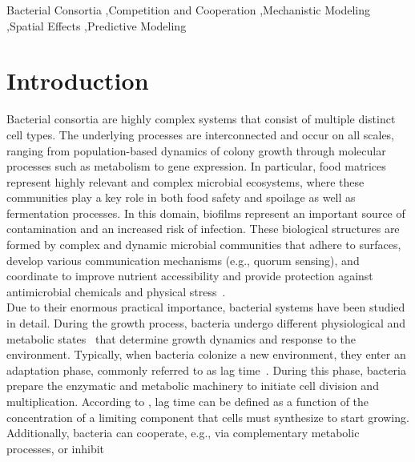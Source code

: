 \documentclass[10pt,1p,authoryear]{elsarticle}
\numberwithin{equation}{section}
\begin{document}
\begin{keyword}
    Bacterial Consortia
    \sep Competition and Cooperation
    \sep Mechanistic Modeling
    \sep Spatial Effects
    \sep Predictive Modeling
\end{keyword}

\maketitle
\acresetall
%
\section{Introduction}
Bacterial consortia are highly complex systems that consist of multiple distinct cell types.
The underlying processes are interconnected and occur on all scales, ranging from
population-based dynamics of colony growth through molecular processes such as metabolism to gene
expression. In particular, food matrices represent highly relevant and complex microbial ecosystems, where these communities
play a key role in both food safety and spoilage as well as fermentation processes.
In this domain, biofilms represent an important source of contamination and an increased risk of infection. These biological structures are formed by complex and dynamic microbial communities that adhere to
surfaces, develop various communication mechanisms (e.g., quorum sensing), and coordinate to
improve nutrient accessibility and provide protection against antimicrobial chemicals and physical
stress~\citep{Zhao2023}.\\
%
Due to their enormous practical importance, bacterial systems have been studied in detail. 
During the growth process, bacteria undergo different physiological and metabolic
states~\citep{buchanan_when_1997} that determine growth dynamics and response to the environment.
Typically, when bacteria colonize a new environment, they enter an adaptation phase, commonly
referred to as lag time~\citep{monod_growth_1949, swinnen_predictive_2004, rolfe_lag_2012}.
During this phase, bacteria prepare the enzymatic and metabolic machinery to initiate cell division
and multiplication.
According to \citet{baranyi_dynamic_1994}, lag time can be defined as a function of the concentration of a limiting component that cells must synthesize
to start growing. Additionally, bacteria can cooperate, e.g., via complementary metabolic processes, or inhibit
\end{document}
